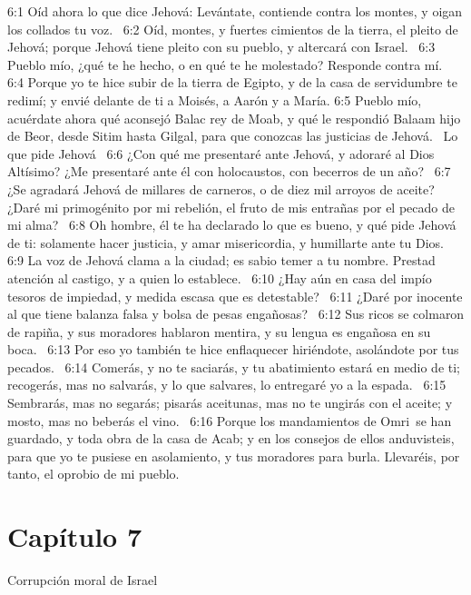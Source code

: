 6:1 Oíd ahora lo que dice Jehová: Levántate, contiende contra los montes, y oigan los collados tu voz.  
6:2 Oíd, montes, y fuertes cimientos de la tierra, el pleito de Jehová; porque Jehová tiene pleito con su pueblo, y altercará con Israel.  
6:3 Pueblo mío, ¿qué te he hecho, o en qué te he molestado? Responde contra mí.  
6:4 Porque yo te hice subir de la tierra de Egipto, y de la casa de servidumbre te redimí; y envié delante de ti a Moisés, a Aarón y a María. 
6:5 Pueblo mío, acuérdate ahora qué aconsejó Balac rey de Moab, y qué le respondió Balaam hijo de Beor, desde Sitim hasta Gilgal, para que conozcas las justicias de Jehová.  
Lo que pide Jehová  
6:6 ¿Con qué me presentaré ante Jehová, y adoraré al Dios Altísimo? ¿Me presentaré ante él con holocaustos, con becerros de un año?  
6:7 ¿Se agradará Jehová de millares de carneros, o de diez mil arroyos de aceite? ¿Daré mi primogénito por mi rebelión, el fruto de mis entrañas por el pecado de mi alma?  
6:8 Oh hombre, él te ha declarado lo que es bueno, y qué pide Jehová de ti: solamente hacer justicia, y amar misericordia, y humillarte ante tu Dios.  
6:9 La voz de Jehová clama a la ciudad; es sabio temer a tu nombre. Prestad atención al castigo, y a quien lo establece.  
6:10 ¿Hay aún en casa del impío tesoros de impiedad, y medida escasa que es detestable?  
6:11 ¿Daré por inocente al que tiene balanza falsa y bolsa de pesas engañosas?  
6:12 Sus ricos se colmaron de rapiña, y sus moradores hablaron mentira, y su lengua es engañosa en su boca.  
6:13 Por eso yo también te hice enflaquecer hiriéndote, asolándote por tus pecados.  
6:14 Comerás, y no te saciarás, y tu abatimiento estará en medio de ti; recogerás, mas no salvarás, y lo que salvares, lo entregaré yo a la espada.  
6:15 Sembrarás, mas no segarás; pisarás aceitunas, mas no te ungirás con el aceite; y mosto, mas no beberás el vino.  
6:16 Porque los mandamientos de Omri se han guardado, y toda obra de la casa de Acab; y en los consejos de ellos anduvisteis, para que yo te pusiese en asolamiento, y tus moradores para burla. Llevaréis, por tanto, el oprobio de mi pueblo.  
\section*{Capítulo 7 }
Corrupción moral de Israel  

